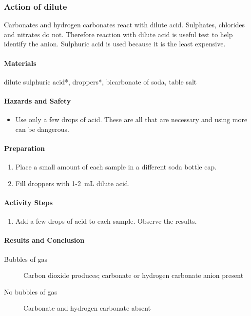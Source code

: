 \subsubsection{Action of dilute \texorpdfstring{}{H2SO4}}

Carbonates and hydrogen carbonates react with dilute acid. Sulphates, chlorides and nitrates do not. Therefore reaction with dilute acid is useful test to help identify the anion. Sulphuric acid is used because it is the least expensive.

\paragraph{Materials}
dilute sulphuric acid*, droppers*, bicarbonate of soda, table salt

\paragraph{Hazards and Safety}
\begin{itemize}
\item{Use only a few drops of acid. These are all that are necessary and using more can be dangerous.}
\end{itemize}

\paragraph{Preparation}
\begin{enumerate}
\item{Place a small amount of each sample in a different soda bottle cap.}
\item{Fill droppers with 1-2~mL dilute acid.}
\end{enumerate}

\paragraph{Activity Steps}
\begin{enumerate}
\item{Add a few drops of acid to each sample. Observe the results.}
\end{enumerate}

\paragraph{Results and Conclusion}
\begin{description}
\item[Bubbles of gas]{Carbon dioxide produces; carbonate or hydrogen carbonate anion present}
\item[No bubbles of gas]{Carbonate and hydrogen carbonate absent}
\end{description}

